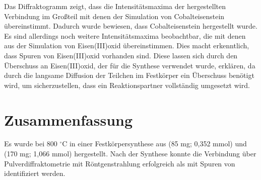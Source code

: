 \documentclass[a4paper,12pt,bibliography=totocnumbered]{scrartcl}
\begin{document}
Das Diffraktogramm zeigt, dass die Intensitätsmaxima der hergestellten Verbindung im Großteil mit denen der Simulation von Cobalteisenstein übereinstimmt.
Dadurch wurde bewiesen, dass Cobalteisenstein hergestellt wurde. Es sind allerdings noch weitere Intensitätsmaxima beobachtbar, die mit denen aus der Simulation von Eisen(III)oxid übereinstimmen.
Dies macht erkenntlich, dass Spuren von Eisen(III)oxid vorhanden sind. Diese lassen sich durch den Überschuss an Eisen(III)oxid, der für die Synthese verwendet wurde, erklären, 
da durch die langsame Diffusion der Teilchen im Festkörper ein Überschuss benötigt wird, um sicherzustellen, dass ein Reaktionspartner vollständig umgesetzt wird.  



\section{Zusammenfassung}
Es wurde  bei 800 $^\circ$C in einer Festkörpersynthese aus  (85 mg; 0,352 mmol) und  (170 mg; 1,066 mmol) hergestellt. 
Nach der Synthese konnte die Verbindung über Pulverdiffraktometrie mit Röntgenstrahlung erfolgreich als  mit Spuren von  identifiziert werden.

\newpage

\printbibliography[title={Literatur}]
\end{document}
